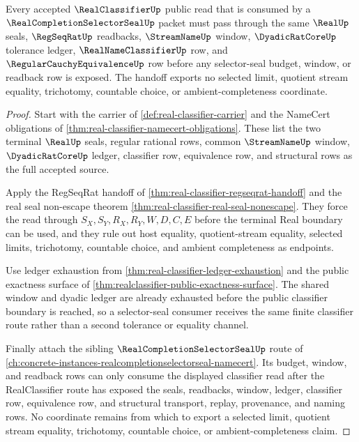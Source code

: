 \begin{theorem}
\label{thm:realclassifier-completion-selector-seal-readback}
Every accepted $\RealClassifierUp$ public read that is consumed by a $\RealCompletionSelectorSealUp$ packet must pass through the same $\RealUp$ seals, $\RegSeqRatUp$ readbacks, $\StreamNameUp$ window, $\DyadicRatCoreUp$ tolerance ledger, $\RealNameClassifierUp$ row, and $\RegularCauchyEquivalenceUp$ row before any selector-seal budget, window, or readback row is exposed. The handoff exports no selected limit, quotient stream equality, trichotomy, countable choice, or ambient-completeness coordinate.
\end{theorem}
\begin{proof}
Start with the carrier of \autoref{def:real-classifier-carrier} and the NameCert obligations of \autoref{thm:real-classifier-namecert-obligations}. These list the two terminal $\RealUp$ seals, regular rational rows, common $\StreamNameUp$ window, $\DyadicRatCoreUp$ ledger, classifier row, equivalence row, and structural rows as the full accepted source.

Apply the RegSeqRat handoff of \autoref{thm:real-classifier-regseqrat-handoff} and the real seal non-escape theorem \autoref{thm:real-classifier-real-seal-nonescape}. They force the read through $S_X,S_Y,R_X,R_Y,W,D,C,E$ before the terminal Real boundary can be used, and they rule out host equality, quotient-stream equality, selected limits, trichotomy, countable choice, and ambient completeness as endpoints.

Use ledger exhaustion from \autoref{thm:real-classifier-ledger-exhaustion} and the public exactness surface of \autoref{thm:realclassifier-public-exactness-surface}. The shared window and dyadic ledger are already exhausted before the public classifier boundary is reached, so a selector-seal consumer receives the same finite classifier route rather than a second tolerance or equality channel.

Finally attach the sibling $\RealCompletionSelectorSealUp$ route of \autoref{ch:concrete-instances-realcompletionselectorseal-namecert}. Its budget, window, and readback rows can only consume the displayed classifier read after the RealClassifier route has exposed the seals, readbacks, window, ledger, classifier row, equivalence row, and structural transport, replay, provenance, and naming rows. No coordinate remains from which to export a selected limit, quotient stream equality, trichotomy, countable choice, or ambient-completeness claim.
\end{proof}

